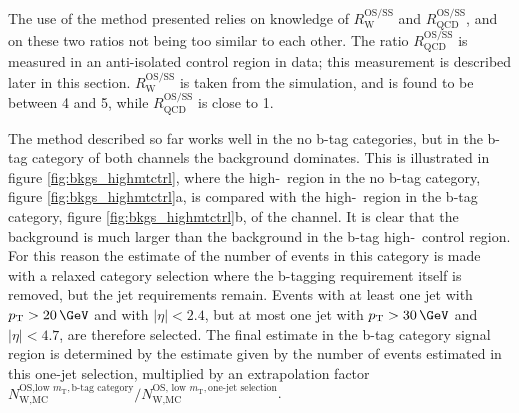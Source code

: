 The use of the method presented relies on knowledge of $R_{\text{W}}^{\text{OS/SS}}$ and 
$R_{\text{QCD}}^{\text{OS/SS}}$, and on these two ratios not being too similar to each other. 
The ratio $R_{\text{QCD}}^{\text{OS/SS}}$ is measured in an anti-isolated
control region in data; this measurement is described later in this section. $R_{\text{W}}^{\text{OS/SS}}$ is 
taken from the \Wjets simulation, and is found to be between 4 and 5, while $R_{\text{QCD}}^{\text{OS/SS}}$
is close to 1.

The method described so far works well in the no b-tag categories, but in the b-tag category of both channels
the \ttbar background dominates. This is illustrated in figure \ref{fig:bkgs_highmtctrl}, where
the high-\mT~region in the no b-tag category, figure \ref{fig:bkgs_highmtctrl}a, is compared with the high-\mT~region in the 
b-tag category, figure \ref{fig:bkgs_highmtctrl}b, of the \etau channel. It is clear that the \ttbar 
background is much larger than the \Wjets background in the b-tag high-\mT~control region.
For this reason the estimate of the number
of \Wjets events in this category is made with a relaxed category selection where the b-tagging
requirement itself is removed, but the jet requirements remain. Events with at least one 
jet with $\pTm>20\,\GeV$ and with $|\eta|<2.4$, but at most one jet with $\pTm>30\,\GeV$ and $|\eta|<4.7$, are therefore selected. The final \Wjets estimate in the b-tag category signal
region is determined by the estimate given by the number of \Wjets events
estimated in this one-jet selection, multiplied by an extrapolation factor 
$N_{\text{W,MC}}^{\text{OS,low } m_{\text{T}},\text{b-tag category}}/N_{\text{W,MC}}^{\text{OS, low }m_{\text{T}},\text{one-jet selection}}$.
